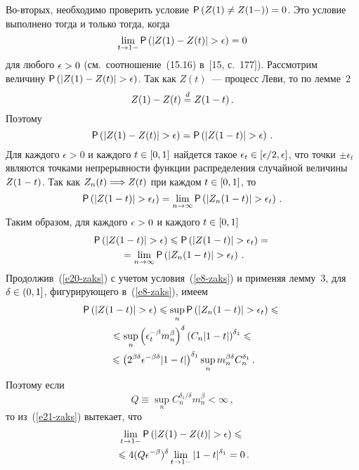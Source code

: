 \begin{multicols}{2}
Во-вторых, необходимо проверить условие ${\sf P}\left(Z(1)\hm\neq
Z(1-)\right)\hm=0$. Это условие выполнено тогда и только тогда, когда
$$
\lim\limits_{t\to1-}{\sf P}\left(|Z(1)-Z(t)|>\epsilon\right)=0
$$
для любого $\epsilon\hm>0$ (см.\ соотношение~(15.16) в~[15, с.~177]).
Рассмотрим величину ${\sf P}\left(|Z(1)\hm-Z(t)|\hm>\epsilon\right)$. Так
как $Z(t)$~--- процесс Леви, то по лемме~2 
$$
Z(1)\hm-Z(t)\eqd Z(1-t)\,.
$$
Поэтому
$$
{\sf P}\left(|Z(1)-Z(t)|>\epsilon\right)={\sf P}\left(|Z(1-t)|>\epsilon\right)\,.
$$
Для каждого $\epsilon>0$ и каждого $t\hm\in[0,1]$ найдется такое
$\epsilon_t\hm\in[\epsilon/2,\epsilon]$, что точки $\pm\epsilon_t$
являются точками непрерывности функции распределения случайной
величины $Z(1\hm-t)$. Так как $Z_n(t)\hm\Longrightarrow Z(t)$ при каж\-дом
$t\hm\in[0,1]$, то
$$
{\sf P}\left(|Z(1-t)|>\epsilon_t\right)=\lim_{n\to\infty}{\sf P}\left(|Z_n(1-t)|>\epsilon_t\right)\,.
$$
Таким образом, для каждого $\epsilon\hm>0$ и каждого $t\hm\in[0,1]$
\begin{multline}
{\sf P}\left(|Z(1-t)|>\epsilon\right)\leqslant{\sf P}\left(|Z(1-t)|>\epsilon_t\right)={}\\
{}=\lim\limits_{n\to\infty}{\sf P}
\left(|Z_n(1-t)|>\epsilon_t\right)\,.\label{e20-zaks}
\end{multline}
Продолжив~(\ref{e20-zaks}) с учетом условия~(\ref{e8-zaks}) и применяя лемму~3, для
$\delta\hm\in(0,1]$, фигурирующего в~(\ref{e8-zaks}), имеем
\begin{multline}
{\sf P}\left(|Z(1-t)|>\epsilon\right)\leqslant\sup\limits_n{\sf P}\left(|Z_n(1-t)|>\epsilon_t\right)\leqslant{}\\
{}\leqslant\sup\limits_n\left(\epsilon_t^{-\beta}m_n^{\beta}\right)^{\delta}\left(C_n|1-t|\right)^{\delta_1}\leqslant{}\\
{}\leqslant
\left(2^{\beta\delta}\epsilon^{-\beta\delta}|1-t|\right)^{\delta_1}\sup\limits_nm_n^{\beta\delta}C_n^{\delta_1}\,.
\label{e21-zaks}
\end{multline}
Поэтому если
\begin{equation}
Q\equiv\sup\limits_nC_n^{\delta_1/\delta}m_n^{\beta}<\infty\,,\label{e22-zaks}
\end{equation}
то из~(\ref{e21-zaks}) вытекает, что
\begin{multline*}
\lim\limits_{t\to1-}{\sf P}\left(|Z(1)-Z(t)|>\epsilon\right)\leqslant{}\\
{}\leqslant
4(Q\epsilon^{-\beta})^{\delta}\lim\limits_{t\to1-}|1-t|^{\delta_1}=0\,.
\end{multline*}


\end{multicols}
